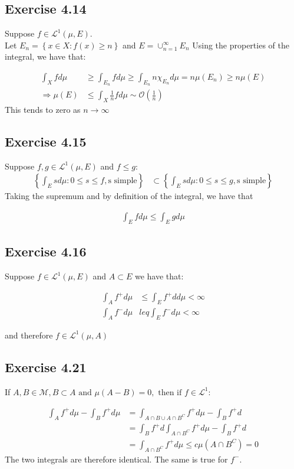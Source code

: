 \documentclass[11pt]{article}
\numberwithin{equation}{section}
\theoremstyle{plain}
\theoremstyle{definition}
\newcommand\braces[1]{\left\{ #1 \right\}}
\def\ss{\subset}
\def\imp{\Rightarrow}
\newcommand{\1}{\mathbbm 1}
\newcommand{\oO}{\mathcal O}
\begin{document}
\subsection*{Exercise 4.14}

Suppose $f \in \mathscr{L}^{1}(\mu, E)$. \\
Let $ E_n = \braces{x \in X: f(x) \geq n}$ and $E = \cup^{\infty}_{n=1} E_n$ Using the properties of the integral, we have that:

\begin{align}
\int_{X} f d \mu &\geq \int_{E_n} f d \mu \geq \int_{E_n} n \chi_{E_{n}} d \mu = n \mu(E_n) \geq n \mu(E) \\
\imp \mu(E) &\leq \int_{X} \frac{1}{n} f d \mu \sim \oO (\frac{1}{n})
\end{align}
This tends to zero as $n \to \infty$



\subsection*{Exercise 4.15}



Suppose $f,g \in \mathscr{L}^{1}(\mu, E)$ and $f \leq g$: 
\begin{align}
\braces{\int_{E} s d \mu: 0 \leq s \leq f, \text{s simple}} &\ss \braces{\int_{E} s d \mu: 0 \leq s \leq g, \text{s simple}}
\end{align}
Taking the supremum and by definition of the integral, we have that

\begin{align}
\int_{E} f d \mu \leq \int_{E} g d\mu
\end{align}

\subsection*{Exercise 4.16}
Suppose $f \in \mathscr{L}^{1}(\mu, E)$ and $A \ss E$
we have that: 


\begin{align}
\int_{A} f^+ d \mu &\leq \int_{E} f^+ d d \mu < \infty \\
\int_{A} f^- d \mu &leq \int_{E} f^- d \mu  < \infty
\end{align}


and therefore $f \in \mathscr{L}^{1}(\mu, A)$

\subsection*{Exercise 4.21}
If $A, B \in \mathcal{M}, B \subset A \text { and } \mu(A-B)=0, \text { then if } f \in \mathscr{L}^{1}$:

\begin{align}
\int_{A} f^+ d \mu - \int_{B} f^+ d \mu &= \int_{A\cap B \cup A \cap B^C} f^+ d \mu - \int_{B} f^+ d  \\
 		&= \int_{B} f^+ d \int_{A \cap B^C} f^+ d \mu - \int_{B} f^+ d \\
 		& = \int_{A \cap B^C} f^+ d \mu \leq c \mu (A \cap B^C) = 0
\end{align}
The two integrals are therefore identical. The same is true for $f^-$.
\end{document}
